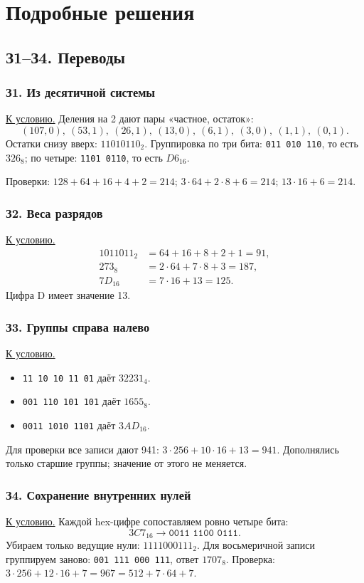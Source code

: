 \chapter{Подробные решения}

\section{З1--З4. Переводы}
\subsection*{З1. Из десятичной системы}\label{sol:z1}
\hyperref[task:z1]{К условию.}
Деления на 2 дают пары «частное, остаток»:
\[
(107,0),\ (53,1),\ (26,1),\ (13,0),\ (6,1),\ (3,0),\ (1,1),\ (0,1).
\]
Остатки снизу вверх: $11010110_2$.
Группировка по три бита: \texttt{011 010 110}, то есть $326_8$; по четыре: \texttt{1101 0110}, то есть $D6_{16}$.

Проверки: $128+64+16+4+2=214$;
$3\cdot64+2\cdot8+6=214$;
$13\cdot16+6=214$.

\subsection*{З2. Веса разрядов}\label{sol:z2}
\hyperref[task:z2]{К условию.}
\begin{align*}
1011011_2&=64+16+8+2+1=91,\\
273_8&=2\cdot64+7\cdot8+3=187,\\
7D_{16}&=7\cdot16+13=125.
\end{align*}
Цифра D имеет значение 13.

\subsection*{З3. Группы справа налево}\label{sol:z3}
\hyperref[task:z3]{К условию.}
\begin{itemize}
    \item \texttt{11 10 10 11 01} даёт $32231_4$.
    \item \texttt{001 110 101 101} даёт $1655_8$.
    \item \texttt{0011 1010 1101} даёт $3AD_{16}$.
\end{itemize}
Для проверки все записи дают 941: $3\cdot256+10\cdot16+13=941$.
Дополнялись только старшие группы; значение от этого не меняется.

\subsection*{З4. Сохранение внутренних нулей}\label{sol:z4}
\hyperref[task:z4]{К условию.}
Каждой hex-цифре сопоставляем ровно четыре бита:
\[
3C7_{16}\longrightarrow\texttt{0011 1100 0111}.
\]
Убираем только ведущие нули: $1111000111_2$. Для восьмеричной записи группируем заново: \texttt{001 111 000 111}, ответ $1707_8$.
Проверка: $3\cdot256+12\cdot16+7=967=512+7\cdot64+7$.

